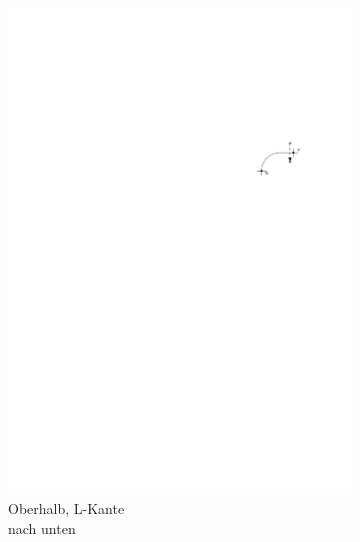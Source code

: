 \documentclass[a4paper]{scrreprt}
\theoremstyle{definition}
\begin{document}
\begin{figure}[h]
\begin{subfigure}[b]{0.2\textwidth}
                \includegraphics[width=\textwidth]{schnitt_finden_top_downwardsL}
                \caption{Oberhalb, L-Kante \\ nach unten}
                \label{fig:cutfinding_top_downwardsL}
        \end{subfigure}
        \quad
        \begin{subfigure}[b]{0.2\textwidth}

\end{subfigure}
\end{figure}
\end{document}
